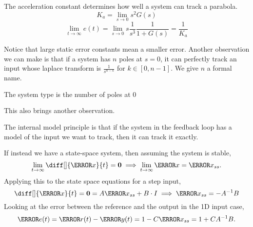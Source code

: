 \begin{definition}
  The acceleration constant determines how well a system can track a parabola.
  \begin{equation}
	K_a = \lim_{s\to0}s^2G(s)
	\label{eqn:acceleration-constant}
  \end{equation}
  \[
	\lim_{t\to\infty} e(t) = \lim_{s\to0} s \frac{1}{s^3} \frac{1}{1+G(s)} = \frac{1}{K_a}
  \]
  \label{defn:acceleration-constant}
\end{definition}
Notice that large static error constants mean a smaller error.
Another observation we can make is that if a system has $n$ poles at $s=0$, it can perfectly track an input whose laplace transform is $\frac{1}{s^{n-k}}$ for $k\in[0, n-1]$. We give $n$ a formal name.
\begin{definition}
  The system type is the number of poles at 0
  \label{defn:system-type}
\end{definition}
This also brings another observation.
\begin{definition}
  The internal model principle is that if the system in the feedback loop has a model of the input we want to track, then it can track it exactly.
  \label{defn:interal-model}
\end{definition}
If instead we have a state-space system, then assuming the system is stable,
\[
  \lim_{t\to\infty}\diff[]{\V{x}}{t} = \bs{0} \implies \lim_{t\to\infty}\V{x} = \V{x}_{ss}.
\]
Applying this to the state space equations for a step input,
\begin{equation}
  \diff[]{\V{x}}{t} = \bs{0} = A\V{x}_{ss} + B\cdot I \implies \V{x}_{ss} = -A^{-1}B
  \label{eqn:ss-sse}
\end{equation}
Looking at the error between the reference and the output in the 1D input case,
\[
  \V{e}(t) = \V{r}(t) - \V{y}(t) = 1 - C\V{x}_{ss} = 1 + CA^{-1}B.
\]
